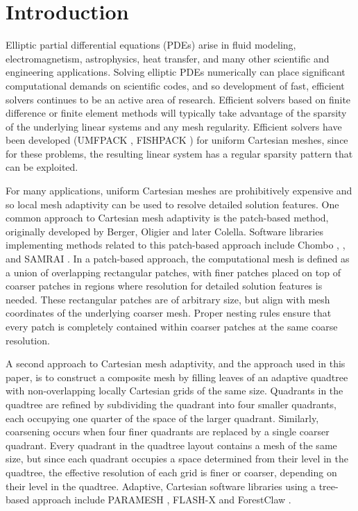 \section{Introduction}
\label{sec:intro}

Elliptic partial differential equations (PDEs) arise in fluid modeling, electromagnetism, astrophysics, heat transfer, and many other scientific and engineering applications. Solving elliptic PDEs numerically can place significant computational demands on scientific codes, and so development of fast, efficient solvers continues to be an active area of research.  Efficient solvers based on finite difference or finite element methods will typically take advantage of the sparsity of the underlying linear systems and any mesh regularity.  Efficient solvers have been developed (UMFPACK \cite{davis2004algorithm}, FISHPACK \cite{swarztrauber1999fishpack}) for uniform Cartesian meshes, since for these problems, the resulting linear system has a regular sparsity pattern that can be exploited.

For many applications, uniform Cartesian meshes are prohibitively expensive and so local mesh adaptivity can be used to resolve detailed solution features.  One common approach to Cartesian mesh adaptivity is the patch-based method, originally developed by Berger, Oligier and later Colella. Software libraries implementing methods related to this patch-based approach include Chombo \cite{colella2009chombo}, \amrex \cite{zhang2019amrex}, and SAMRAI \cite{hornung2006managing}. In a patch-based approach, the computational mesh is defined as a union of overlapping rectangular patches, with finer patches placed on top of coarser patches in regions where resolution for  detailed solution features is needed.  These rectangular patches are of arbitrary size, but align with mesh coordinates of the underlying coarser mesh. Proper nesting rules ensure that every patch is completely contained within coarser patches at the same coarse resolution. 

A second approach to Cartesian mesh adaptivity, and the approach used in this paper, is to construct a composite mesh by filling leaves of an adaptive quadtree with non-overlapping locally Cartesian grids of the same size. Quadrants in the quadtree are refined by subdividing the quadrant into four smaller quadrants, each occupying one quarter of the space of the larger quadrant. Similarly, coarsening occurs when four finer quadrants are replaced by a single coarser quadrant.  Every quadrant in the quadtree layout contains a mesh of the same size, but since each quadrant occupies a space determined from their level in the quadtree, the effective resolution of each grid is finer or coarser, depending on their level in the quadtree.  Adaptive, Cartesian software libraries using a tree-based approach include PARAMESH \cite{globisch1995parmesh}, FLASH-X \cite{dubey2022flash} and ForestClaw \cite{calhoun2017forestclaw}.

